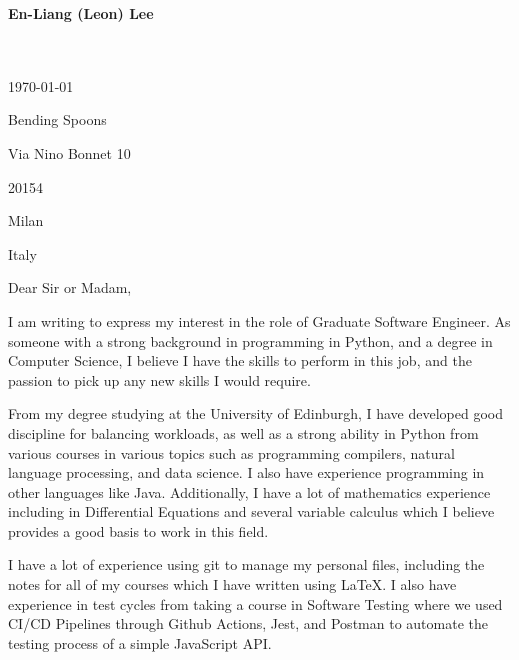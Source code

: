 \documentclass[10pt,english]{article}
\begin{document}
\setlength{\columnsep}{2.2em}
\setlength{\columnseprule}{4pt}



\newpage

\setlength{\columnsep}{2.2em}
\setlength{\columnseprule}{4pt}

\begin{minipage}[c][2.5cm][c]{1\mpwidth}
	\LARGE{\textbf{\textcolor{maincol}{En-Liang (Leon) Lee}}} \\[2pt]
	\normalsize{}\\
	\\
\end{minipage}

\bigskip

\begin{minipage}[c][2.5cm][c]{1\mpwidth}
	\today
	\bigskip

	Bending Spoons

	Via Nino Bonnet 10

	20154

	Milan
	
	Italy
\end{minipage}
\bigskip\bigskip

Dear Sir or Madam,
\medskip

I am writing to express my interest in the role of Graduate Software Engineer. As someone with a strong background in programming in Python, and a degree in Computer Science, I believe I have the skills to perform in this job, and the passion to pick up any new skills I would require.

\medskip

From my degree studying at the University of Edinburgh, I have developed good discipline for balancing workloads, as well as a strong ability in Python from various courses in various topics such as programming compilers, natural language processing, and data science. I also have experience programming in other languages like Java. Additionally, I have a lot of mathematics experience including in Differential Equations and several variable calculus which I believe provides a good basis to work in this field.

I have a lot of experience using git to manage my personal files, including the notes for all of my courses which I have written using LaTeX. I also have experience in test cycles from taking a course in Software Testing where we used CI/CD Pipelines through Github Actions, Jest, and Postman to automate the testing process of a simple JavaScript API.
\end{document}

